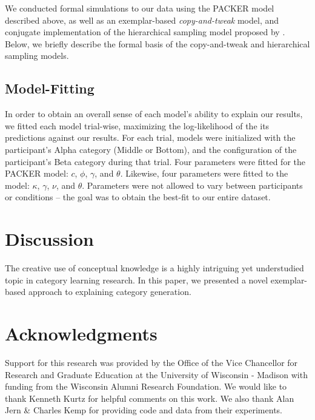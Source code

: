\documentclass[10pt,letterpaper]{article}
\begin{document}
We conducted formal simulations to our data using the PACKER model described above, as well as an exemplar-based \textit{copy-and-tweak} model, and conjugate implementation of the hierarchical sampling model proposed by \citet{jern2013probabilistic}. Below, we briefly describe the formal basis of the copy-and-tweak and hierarchical sampling models.


\subsection{Model-Fitting}
In order to obtain an overall sense of each model's ability to explain our results, we fitted each model trial-wise, maximizing the log-likelihood of the its predictions against our results. For each trial, models were initialized with the participant's Alpha category (Middle or Bottom), and the configuration of the participant's Beta category during that trial. Four parameters were fitted for the PACKER model: $c$, $\phi$, $\gamma$, and $\theta$. Likewise, four parameters were fitted to the \cite{jern2013probabilistic} model: $\kappa$, $\gamma$, $\nu$, and $\theta$. Parameters were not allowed to vary between participants or conditions -- the goal was to obtain the best-fit to our entire dataset.

\section{Discussion}

The creative use of conceptual knowledge is a highly intriguing yet understudied topic in category learning research. In this paper, we presented a novel exemplar-based approach to explaining category generation.

\section{Acknowledgments}
Support for this research was provided by the Office of the Vice Chancellor for Research and Graduate Education at the University of Wisconsin - Madison with funding from the Wisconsin Alumni Research Foundation. We would like to thank Kenneth Kurtz for helpful comments on this work. We also thank Alan Jern \& Charles Kemp for providing code and data from their experiments.




\setlength{\bibleftmargin}{.025in}
\setlength{\bibindent}{-\bibleftmargin}

\end{document}
